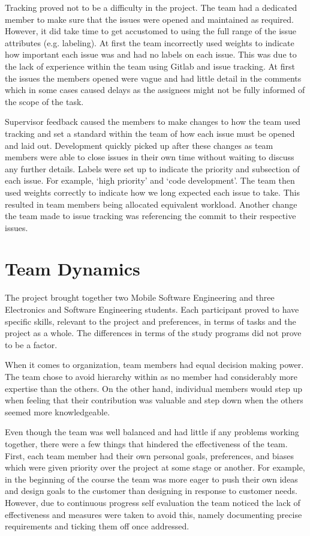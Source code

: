 \documentclass{l3proj}
\begin{document}
Tracking proved not to be a difficulty in the project. The team had a dedicated member to make sure that the issues were opened and maintained as required. However, it did take time to get accustomed to using the full range of the issue attributes (e.g. labeling). At first the team incorrectly used weights to indicate how important each issue was and had no labels on each issue. This was due to the lack of experience within the team using Gitlab and issue tracking. At first the issues the members opened were vague and had little detail in the comments which in some cases caused delays as the assignees might not be fully informed of the scope of the task.
 
Supervisor feedback caused the members to make changes to how the team used tracking and set a standard within the team of how each issue must be opened and laid out. Development quickly picked up after these changes as team members were able to close issues in their own time without waiting to discuss any further details. Labels were set up to indicate the priority and subsection of each issue. For example, ‘high priority' and ‘code development'. The team then used weights correctly to indicate how we long expected each issue to take. This resulted in team members being allocated equivalent workload. Another change the team made to issue tracking was referencing the commit to their respective issues.

\section{Team Dynamics}
\label{sec:teamdynamics}

The project brought together two Mobile Software Engineering and three Electronics and Software Engineering students. Each participant proved to have specific skills, relevant to the project and preferences, in terms of tasks and the project as a whole. The differences in terms of the study programs did not prove to be a factor.
 
When it comes to organization, team members had equal decision making power. The team chose to avoid hierarchy within as no member had considerably more expertise than the others. On the other hand, individual members would step up when feeling that their contribution was valuable and step down when the others seemed more knowledgeable. 

Even though the team was well balanced and had little if any problems working together, there were a few things that hindered the effectiveness of the team. First, each team member had their own personal goals, preferences, and biases which were given priority over the project at some stage or another. For example, in the beginning of the course the team was more eager to push their own ideas and design goals to the customer than designing in response to customer needs. However, due to continuous progress self evaluation the team noticed the lack of effectiveness and measures were taken to avoid this, namely documenting precise requirements and ticking them off once addressed. 
\end{document}
